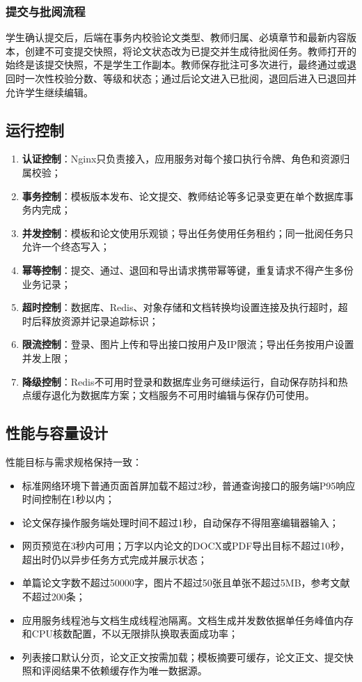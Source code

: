\documentclass{../template/softeng}
\begin{document}
	\subsubsection{提交与批阅流程}
	学生确认提交后，后端在事务内校验论文类型、教师归属、必填章节和最新内容版本，创建不可变提交快照，将论文状态改为已提交并生成待批阅任务。教师打开的始终是该提交快照，不是学生工作副本。教师保存批注可多次进行，最终通过或退回时一次性校验分数、等级和状态；通过后论文进入已批阅，退回后进入已退回并允许学生继续编辑。
	
	\subsection{运行控制}
	\begin{enumerate}
		\item \textbf{认证控制}：Nginx只负责接入，应用服务对每个接口执行令牌、角色和资源归属校验；
		\item \textbf{事务控制}：模板版本发布、论文提交、教师结论等多记录变更在单个数据库事务内完成；
		\item \textbf{并发控制}：模板和论文使用乐观锁；导出任务使用任务租约；同一批阅任务只允许一个终态写入；
		\item \textbf{幂等控制}：提交、通过、退回和导出请求携带幂等键，重复请求不得产生多份业务记录；
		\item \textbf{超时控制}：数据库、Redis、对象存储和文档转换均设置连接及执行超时，超时后释放资源并记录追踪标识；
		\item \textbf{限流控制}：登录、图片上传和导出接口按用户及IP限流；导出任务按用户设置并发上限；
		\item \textbf{降级控制}：Redis不可用时登录和数据库业务可继续运行，自动保存防抖和热点缓存退化为数据库方案；文档服务不可用时编辑与保存仍可使用。
	\end{enumerate}
	
	\subsection{性能与容量设计}
	性能目标与需求规格保持一致：
	\begin{itemize}
		\item 标准网络环境下普通页面首屏加载不超过2秒，普通查询接口的服务端P95响应时间控制在1秒以内；
		\item 论文保存操作服务端处理时间不超过1秒，自动保存不得阻塞编辑器输入；
		\item 网页预览在3秒内可用；万字以内论文的DOCX或PDF导出目标不超过10秒，超出时仍以异步任务方式完成并展示状态；
		\item 单篇论文字数不超过50000字，图片不超过50张且单张不超过5MB，参考文献不超过200条；
		\item 应用服务线程池与文档生成线程池隔离。文档生成并发数依据单任务峰值内存和CPU核数配置，不以无限排队换取表面成功率；
		\item 列表接口默认分页，论文正文按需加载；模板摘要可缓存，论文正文、提交快照和评阅结果不依赖缓存作为唯一数据源。
	\end{itemize}
	
\end{document}
